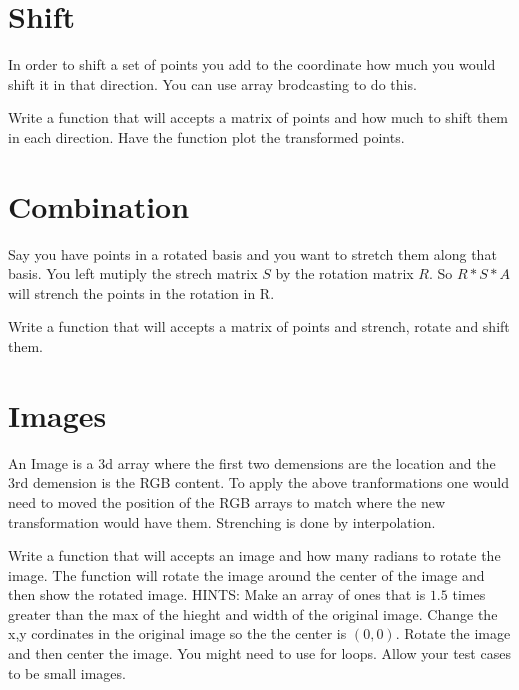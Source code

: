 \section*{Shift}
In order to shift a set of points you add to the coordinate how much you would shift it in that direction. You can use array brodcasting to do this.

\begin{problem}
Write a function that will accepts a matrix of points and how much to shift them in each direction. Have the function plot the transformed points.
\end{problem}

\section*{Combination}
Say you have points in a rotated basis and you want to stretch them along that basis. You left mutiply the strech matrix $S$ by the rotation matrix $R$. So $R*S*A$ will strench the points in the rotation in R. 

\begin{problem}
Write a function that will accepts a matrix of points and strench, rotate and shift them.
\end{problem}


\section*{Images}

An Image is a 3d array where the first two demensions are the location and the 3rd demension is the RGB content. To apply the above tranformations one would need to moved the position of the RGB arrays to match where the new transformation would have them. Strenching is done by
 interpolation.
\begin{problem}
Write a function that will accepts an image and how many radians to rotate the image. The function will rotate the image around the center of the image and then show the rotated image. HINTS: Make an array of ones that is $1.5$ times greater than the max of the hieght and width of the original image. Change the x,y cordinates in the original image so the the center is $(0,0)$. Rotate the image and then center the image. You might need to use for loops. Allow your test cases to be small images.
\end{problem}


% 
